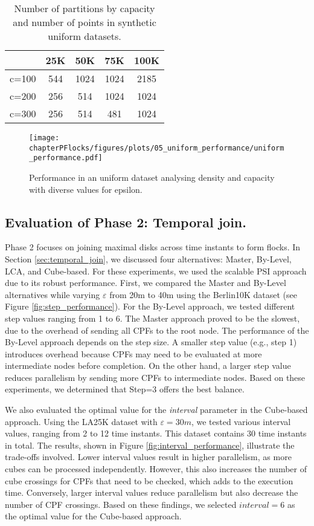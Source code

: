 \begin{table}
    \centering
    \caption{Number of partitions by capacity and number of points in synthetic uniform datasets.}
    \label{tab:uniform_ncells}
    \begin{tabular}{c|cccc}
              & 25K & 50K  & 75K  & 100K \\
        \hline
        c=100 & 544 & 1024 & 1024 & 2185 \\
        c=200 & 256 & 514  & 1024 & 1024 \\
        c=300 & 256 & 514  & 481  & 1024 \\
    \end{tabular}
\end{table}

\begin{figure}
    \centering
    \texttt{[image: chapterPFlocks/figures/plots/05\_uniform\_performance/uniform\_performance.pdf]}
    \caption{Performance in an uniform dataset analysing density and capacity with diverse values for epsilon.}\label{fig:uniform_performance}
\end{figure}

\subsection{Evaluation of Phase 2: Temporal join.}
Phase 2 focuses on joining maximal disks across time instants to form flocks. In Section \ref{sec:temporal_join}, we discussed four alternatives: Master, 
By-Level, LCA, and Cube-based. For these experiments, we used the scalable PSI approach due to its robust performance.
First, we compared the Master and By-Level alternatives while varying $\varepsilon$ from 20m to 40m using the Berlin10K dataset (see Figure 
\ref{fig:step_performance}). For the By-Level approach, we tested different step values ranging from 1 to 6. The Master approach proved to be the slowest, due 
to the overhead of sending all CPFs to the root node. The performance of the By-Level approach depends on the step size. A smaller step value (e.g., step 1) 
introduces overhead because CPFs may need to be evaluated at more intermediate nodes before completion. On the other hand, a larger step value reduces 
parallelism by sending more CPFs to intermediate nodes. Based on these experiments, we determined that Step=3 offers the best balance.

We also evaluated the optimal value for the \textit{interval} parameter in the Cube-based approach. Using the LA25K dataset with $\varepsilon=30m$, we tested 
various interval values, ranging from 2 to 12 time instants. This dataset contains 30 time instants in total. The results, shown in Figure 
\ref{fig:interval_performance}, illustrate the trade-offs involved. Lower interval values result in higher parallelism, as more cubes can be processed 
independently. However, this also increases the number of cube crossings for CPFs that need to be checked, which adds to the execution time. Conversely, larger 
interval values reduce parallelism but also decrease the number of CPF crossings. Based on these findings, we selected $interval=6$ as the optimal value for the 
Cube-based approach.

